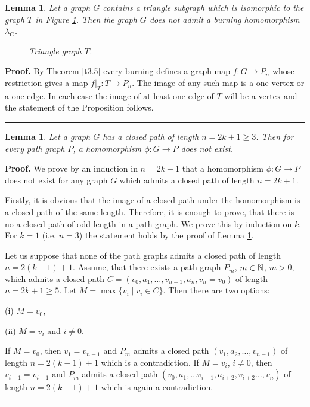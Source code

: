 \documentclass[a4paper, 11pt]{article}
\newtheorem{lemma}[theorem]{Lemma}
\newenvironment{proof}[1][Proof]{\textbf{#1.} }{\ \rule{0.5em}{0.5em}}
\begin{document}
\begin{lemma}\label{l3.8} Let a graph $G$ contains a \emph{triangle} subgraph which is isomorphic to the graph $T$ in Figure \ref{Triangle digraph}. Then the graph $G$ does not admit a burning homomorphism $\lambda_G$. 
\begin{figure}[H]
\centering
{}
  \caption{Triangle graph $T$.}
\label{Triangle digraph}
\end{figure}
\end{lemma}
\begin{proof} By Theorem \ref{t3.5} every burning defines a graph map $f\colon G\to P_n$ whose restriction gives a map $f|_{T}\colon T \to P_n$. The image of any such map  is  a one vertex or a one edge. In each case the image of at least one edge of $T$ will  be a vertex and the statement of the Proposition follows. 
\end{proof} 


\begin{lemma}\label{l3.9}  Let a graph $G$  has a closed path of  length $n=2k+1\geq 3$. Then for every path graph $P$,  a homomorphism $\phi\colon G\to P$ does not exist.  
\end{lemma}

\begin{proof} We prove by an   induction in  $n=2k+1$ that a homomorphism $\phi\colon G\to P$ does not exist  for any graph $G$ which admits a closed path of length $n=2k+1$.

Firstly, it is obvious that the image of a closed path under the homomorphism is a closed path  of the same length. Therefore, it is enough to prove, that there is no a closed path of odd length in a path graph. We prove this by induction on $k$. For $k=1$ (i.e. $n=3$) the statement holds
by the proof of Lemma \ref{l3.8}.

Let us suppose that none of the path graphs admits a closed path of length $n=2(k-1)+1$. Assume, that there exists a path graph $P_m$, $m\in \Bbb N$, $m>0$, which admits a closed path $C=(v_0, a_1,\dots , v_{n-1}, a_n,  v_n=v_0)$ of length $n=2k+1\geq 5$. Let $M=\max \{v_i\;|\; v_i\in C\}$. Then there are two options:

(i) $M=v_0$,

(ii) $M= v_{i}$ and $i\ne 0$.

\noindent If $M=v_0$, then $v_1=v_{n-1}$ and $P_m$ admits a closed path $(v_1,a_2,\dots , v_{n-1})$ of length $n=2(k-1)+1$ which is a contradiction. If $M=v_i$, $i\ne {0}$, then $v_{i-1}=v_{i+1}$ and  $P_m$ admits a closed path $(v_0,a_1,\dots v_{i-1},a_{i+2},v_{i+2}\dots , v_{n})$ of length $n=2(k-1)+1$ which is again a contradiction. \end{proof}
\end{document}
